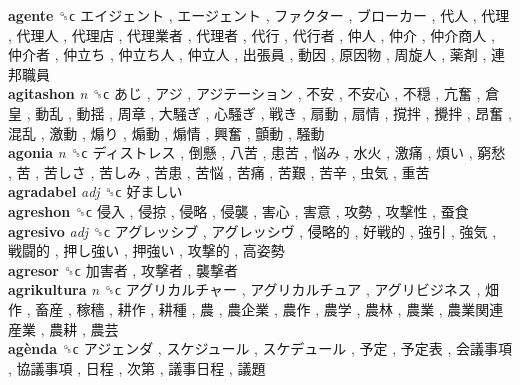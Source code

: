 \textbf{agente} ␝ϲ   エイジェント ,  エージェント ,  ファクター ,  ブローカー ,  代人 ,  代理 ,  代理人 ,  代理店 ,  代理業者 ,  代理者 ,  代行 ,  代行者 ,  仲人 ,  仲介 ,  仲介商人 ,  仲介者 ,  仲立ち ,  仲立ち人 ,  仲立人 ,  出張員 ,  動因 ,  原因物 ,  周旋人 ,  薬剤 ,  連邦職員   \\
\textbf{agitashon} \emph{n}  ␝ϲ   あじ ,  アジ ,  アジテーション ,  不安 ,  不安心 ,  不穏 ,  亢奮 ,  倉皇 ,  動乱 ,  動揺 ,  周章 ,  大騒ぎ ,  心騒ぎ ,  戦き ,  扇動 ,  扇情 ,  撹拌 ,  攪拌 ,  昂奮 ,  混乱 ,  激動 ,  煽り ,  煽動 ,  煽情 ,  興奮 ,  顫動 ,  騒動   \\
\textbf{agonia} \emph{n}  ␝ϲ   ディストレス ,  倒懸 ,  八苦 ,  患苦 ,  悩み ,  水火 ,  激痛 ,  煩い ,  窮愁 ,  苦 ,  苦しさ ,  苦しみ ,  苦患 ,  苦悩 ,  苦痛 ,  苦艱 ,  苦辛 ,  虫気 ,  重苦   \\
\textbf{agradabel} \emph{adj}  ␝ϲ   好ましい   \\
\textbf{agreshon} ␝ϲ   侵入 ,  侵掠 ,  侵略 ,  侵襲 ,  害心 ,  害意 ,  攻勢 ,  攻撃性 ,  蚕食   \\
\textbf{agresivo} \emph{adj}  ␝ϲ   アグレッシブ ,  アグレッシヴ ,  侵略的 ,  好戦的 ,  強引 ,  強気 ,  戦闘的 ,  押し強い ,  押強い ,  攻撃的 ,  高姿勢   \\
\textbf{agresor} ␝ϲ   加害者 ,  攻撃者 ,  襲撃者   \\
\textbf{agrikultura} \emph{n}  ␝ϲ   アグリカルチャー ,  アグリカルチュア ,  アグリビジネス ,  畑作 ,  畜産 ,  稼穡 ,  耕作 ,  耕種 ,  農 ,  農企業 ,  農作 ,  農学 ,  農林 ,  農業 ,  農業関連産業 ,  農耕 ,  農芸   \\
\textbf{agènda} ␝ϲ   アジェンダ ,  スケジュール ,  スケデュール ,  予定 ,  予定表 ,  会議事項 ,  協議事項 ,  日程 ,  次第 ,  議事日程 ,  議題   \\
